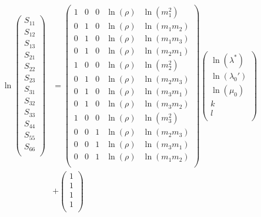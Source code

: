 \documentclass[a4paper,fleqn]{DC_ArtStyle}
\begin{document}
\begin{equation}
	\begin{split}
	\ln
	\begin{pmatrix}
		S_{11} \\
		S_{12} \\
		S_{13} \\
		S_{21} \\
		S_{22} \\
		S_{23} \\
		S_{31} \\
		S_{32} \\
		S_{33} \\
		S_{44} \\
		S_{55} \\
		S_{66} \\
	\end{pmatrix} & = \begin{pmatrix}
		1 & 0 & 0 & \ln(\rho) & \ln(m_1^2) \\
		0 & 1 & 0 & \ln(\rho) & \ln(m_1 m_2) \\
		0 & 1 & 0 & \ln(\rho) & \ln(m_1 m_3) \\
		0 & 1 & 0 & \ln(\rho) & \ln(m_2 m_1) \\
		1 & 0 & 0 & \ln(\rho) & \ln(m_2^2) \\
		0 & 1 & 0 & \ln(\rho) & \ln(m_2 m_3) \\
		0 & 1 & 0 & \ln(\rho) & \ln(m_3 m_1) \\
		0 & 1 & 0 & \ln(\rho) & \ln(m_3 m_2) \\
		1 & 0 & 0 & \ln(\rho) & \ln(m_3^2) \\
		0 & 0 & 1 & \ln(\rho) & \ln(m_2 m_3) \\
		0 & 0 & 1 & \ln(\rho) & \ln(m_3 m_1) \\
		0 & 0 & 1 & \ln(\rho) & \ln(m_1 m_2) \\
	\end{pmatrix} \begin{pmatrix}
		\ln(\lambda^{*}) \\
		\ln(\lambda_0') \\
		\ln(\mu_0) \\
		k \\
		l \\
	\end{pmatrix}\\ & + \begin{pmatrix}
		1 \\
		1 \\
		1 \\
		1 \\

\end{pmatrix}
\end{split}
\end{equation}
\end{document}
